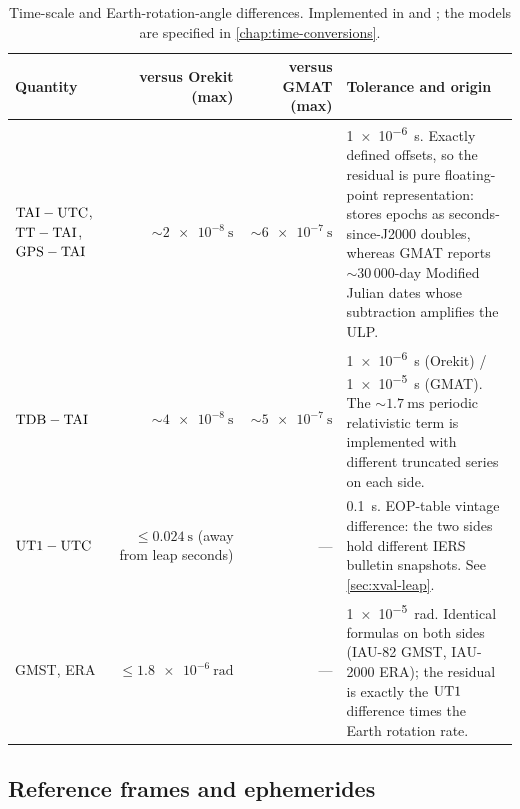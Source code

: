 \begin{table}[htbp]
  \centering
  \caption{Time-scale and Earth-rotation-angle differences. Implemented in
     and
    ; the models are
    specified in \cref{chap:time-conversions}.}
  \label{tab:xval-time}
  \small
  \begin{tabularx}{\textwidth}{@{}W{0.85} r r W{1.15}@{}}
    \toprule
    Quantity & versus Orekit (max) & versus GMAT (max) & Tolerance and origin \\
    \midrule
    $\mathrm{TAI}-\mathrm{UTC}$, $\mathrm{TT}-\mathrm{TAI}$, $\mathrm{GPS}-\mathrm{TAI}$ &
      ${\sim}\SI{2e-8}{\second}$ & ${\sim}\SI{6e-7}{\second}$ &
      \SI{1e-6}{\second}. Exactly defined offsets, so the residual is pure
      floating-point representation: \lupnt{} stores epochs as
      seconds-since-J2000 doubles, whereas GMAT reports ${\sim}30\,000$-day
      Modified Julian dates whose subtraction amplifies the ULP. \\
    $\mathrm{TDB}-\mathrm{TAI}$ &
      ${\sim}\SI{4e-8}{\second}$ & ${\sim}\SI{5e-7}{\second}$ &
      \SI{1e-6}{\second} (Orekit) / \SI{1e-5}{\second} (GMAT). The
      ${\sim}\SI{1.7}{\milli\second}$ periodic relativistic term is
      implemented with different truncated series on each side. \\
    $\mathrm{UT1}-\mathrm{UTC}$ &
      $\leq \SI{0.024}{\second}$ (away from leap seconds) & --- &
      \SI{0.1}{\second}. EOP-table vintage difference: the two sides hold
      different IERS bulletin snapshots. See \cref{sec:xval-leap}. \\
    GMST, ERA &
      $\leq \SI{1.8e-6}{\radian}$ & --- &
      \SI{1e-5}{\radian}. Identical formulas on both sides (IAU-82 GMST,
      IAU-2000 ERA); the residual is exactly the $\mathrm{UT1}$ difference times the
      Earth rotation rate. \\
    \bottomrule
  \end{tabularx}
\end{table}

\subsection{Reference frames and ephemerides}
\label{sec:xval-frames}

